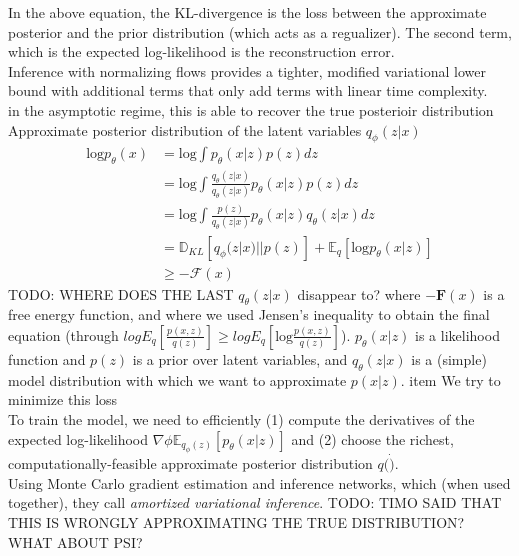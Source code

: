 \documentclass[a4paper,12pt,twoside,openright]{report}
\begin{document}
In the above equation, the KL-divergence is the loss between the approximate posterior and the prior distribution (which acts as a regualizer). The second term, which is the expected log-likelihood is the reconstruction error.\\

Inference with normalizing flows provides a tighter, modified variational lower bound with additional terms that only add terms with linear time complexity.\\

in the asymptotic regime, this is able to recover the true posterioir distribution \\

Approximate posterior distribution of the latent variables $q_\phi(z|x)$ 
\begin{align}
\text{log} p_{\theta}(x) 
&= \text{log} \int{ p_{\theta}(x|z)p(z) dz } \\
&= \text{log} \int{ \frac{q_{\theta}(z|x)}{q_{\theta}(z|x)}p_{\theta}(x|z) p(z) dz } \\
&= \text{log} \int{ \frac{p(z)}{q_{\theta}(z|x)}p_{\theta}(x|z) q_{\theta}(z|x) dz } \\
&= \mathbb{D}_{KL} \left[ q_{\phi}(z|x) || p(z) \right] + \mathbb{E}_q \left[ \text{log} p_{\theta}(x|z) \right] \\
&\geq -\mathcal{F}(x)
\end{align}
TODO: WHERE DOES THE LAST $q_\theta(z|x)$ disappear to?
where $-\mathbf{F}(x)$ is a free energy function, and where we used Jensen's inequality to obtain the final equation (through $log E_q\left[ \frac{p(x, z)}{q(z)} \right] \geq log E_q\left[ \text{log} \frac{p(x, z)}{q(z)} \right] $).
$p_\theta(x|z)$ is a likelihood function and $p(z)$ is a prior over latent variables, and $q_\theta(z|x)$ is a (simple) model distribution with which we want to approximate $p(x|z)$.
item We try to minimize this loss \\

To train the model, we need to efficiently (1) compute the derivatives of the expected log-likelihood  $ \nabla \phi \mathbb{E}_{q_\phi(z)}\left[ p_\theta(x|z) \right]$ and (2) choose the richest, computationally-feasible approximate posterior distribution $q(\dot)$. \\

Using Monte Carlo gradient estimation and inference networks, which (when used together), they call \textit{amortized variational inference}.
TODO: TIMO SAID THAT THIS IS WRONGLY APPROXIMATING THE TRUE DISTRIBUTION? WHAT ABOUT PSI? \\
\end{document}
